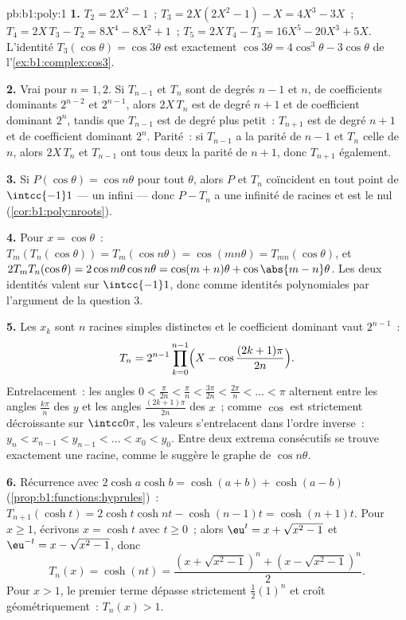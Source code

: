 \begin{solution}{pb:b1:poly:1}
\textbf{1.} $T_2 = 2X^2 - 1$~; $T_3 = 2X(2X^2 - 1) - X = 4X^3 -
3X$~; $T_4 = 2X\,T_3 - T_2 = 8X^4 - 8X^2 + 1$~; $T_5 = 2X\,T_4 - T_3
= 16X^5 - 20X^3 + 5X$. L'identité $T_3(\cos\theta) = \cos3\theta$
est exactement $\cos3\theta = 4\cos^3\theta - 3\cos\theta$ de
l'\cref{ex:b1:complex:cos3}.

\textbf{2.} Vrai pour $n = 1, 2$. Si $T_{n-1}$ et $T_n$ sont de
degrés $n-1$ et $n$, de coefficients dominants $2^{n-2}$ et
$2^{n-1}$, alors $2X\,T_n$ est de degré $n+1$ et de coefficient
dominant $2^n$, tandis que $T_{n-1}$ est de degré plus petit~:
$T_{n+1}$ est de degré $n + 1$ et de coefficient dominant $2^n$.
Parité~: si $T_{n-1}$ a la parité de $n - 1$ et $T_n$ celle de $n$,
alors $2X\,T_n$ et $T_{n-1}$ ont tous deux la parité de $n + 1$, donc
$T_{n+1}$ également.

\textbf{3.} Si $P(\cos\theta) = \cos n\theta$ pour tout $\theta$,
alors $P$ et $T_n$ coïncident en tout point de $\intcc{-1}1$ --- un
 infini --- donc $P - T_n$ a une infinité de racines et est
le  nul (\cref{cor:b1:poly:nroots}).

\textbf{4.} Pour $x = \cos\theta$~: $T_m(T_n(\cos\theta)) =
T_m(\cos n\theta) = \cos(mn\theta) = T_{mn}(\cos\theta)$, et
$2T_mT_n(\cos\theta) = 2\cos m\theta\cos n\theta = \cos(m+n)\theta
+ \cos\abs{m - n}\theta$. Les deux identités valent sur
$\intcc{-1}1$, donc comme identités polynomiales par l'argument de
la question 3.

\textbf{5.} Les $x_k$ sont $n$ racines simples distinctes et le
coefficient dominant vaut $2^{n-1}$~:
\[
T_n = 2^{n-1}\prod_{k=0}^{n-1}
\Bigl(X - \cos\frac{(2k+1)\pi}{2n}\Bigr) .
\]
Entrelacement~: les angles $0 < \frac{\pi}{2n} < \frac\pi n <
\frac{3\pi}{2n} < \frac{2\pi}n < \dots < \pi$ alternent entre les
angles $\frac{k\pi}n$ des $y$ et les angles $\frac{(2k+1)\pi}{2n}$
des $x$~; comme $\cos$ est strictement décroissante sur
$\intcc0\pi$, les valeurs s'entrelacent dans l'ordre inverse~: $y_n
< x_{n-1} < y_{n-1} < \dots < x_0 < y_0$. Entre deux extrema
consécutifs se trouve exactement une racine, comme le suggère le
graphe de $\cos n\theta$.

\textbf{6.} Récurrence avec $2\cosh a\cosh b = \cosh(a + b) +
\cosh(a - b)$ (\cref{prop:b1:functions:hyprules})~: $T_{n+1}(\cosh
t) = 2\cosh t\cosh nt - \cosh(n-1)t = \cosh(n+1)t$. Pour $x \geq
1$, écrivons $x = \cosh t$ avec $t \geq 0$~; alors $\eu^t = x +
\sqrt{x^2 - 1}$ et $\eu^{-t} = x - \sqrt{x^2 - 1}$, donc
\[
T_n(x) = \cosh(nt)
= \frac{(x + \sqrt{x^2-1})^n + (x - \sqrt{x^2-1})^n}2 .
\]
Pour $x > 1$, le premier terme dépasse strictement $\frac12(1)^n$ et
croît géométriquement~: $T_n(x) > 1$.


\end{solution}
